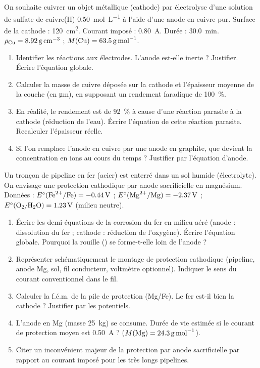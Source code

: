 \documentclass[11pt]{article}
\begin{document}
\begin{exercice}
On souhaite cuivrer un objet métallique (cathode) par électrolyse d'une solution de sulfate de cuivre(II)  \SI{0,50}{mol.L^{-1}} à l'aide d'une anode en cuivre pur. Surface de la cathode : \SI{120}{cm^2}. Courant imposé : \SI{0,80}{A}. Durée : \SI{30,0}{min}. $\rho_{\ce{Cu}} = \SI{8,92}{g.cm^{-3}}$ ; $M(\ce{Cu}) = \SI{63,5}{g.mol^{-1}}$.
\begin{enumerate}
    \item Identifier les réactions aux électrodes. L'anode est-elle inerte ? Justifier. Écrire l'équation globale.
    \item Calculer la masse de cuivre déposée sur la cathode et l'épaisseur moyenne de la couche (en \si{\micro\meter}), en supposant un rendement faradique de \SI{100}{\%}.
    \item En réalité, le rendement est de \SI{92}{\%} à cause d'une réaction parasite à la cathode (réduction de l'eau). Écrire l'équation de cette réaction parasite. Recalculer l'épaisseur réelle.
    \item Si l'on remplace l'anode en cuivre par une anode en graphite, que devient la concentration en ions  au cours du temps ? Justifier par l'équation d'anode.
\end{enumerate}
\end{exercice}

\begin{exercice}
Un tronçon de pipeline en fer (acier) est enterré dans un sol humide (électrolyte). On envisage une protection cathodique par anode sacrificielle en magnésium.
Données : $E^\circ(\ce{Fe^{2+}/Fe}) = \SI{-0,44}{V}$ ; $E^\circ(\ce{Mg^{2+}/Mg}) = \SI{-2,37}{V}$ ; $E^\circ(\ce{O2/H2O}) = \SI{+1,23}{V}$ (milieu neutre).
\begin{enumerate}
    \item Écrire les demi-équations de la corrosion du fer en milieu aéré (anode : dissolution du fer ; cathode : réduction de l'oxygène). Écrire l'équation globale. Pourquoi la rouille () se forme-t-elle loin de l'anode ?
    \item Représenter schématiquement le montage de protection cathodique (pipeline, anode Mg, sol, fil conducteur, voltmètre optionnel). Indiquer le sens du courant conventionnel dans le fil.
    \item Calculer la f.é.m. de la pile de protection (Mg/Fe). Le fer est-il bien la cathode ? Justifier par les potentiels.
    \item L'anode en Mg (masse \SI{25}{kg}) se consume. Durée de vie estimée si le courant de protection moyen est \SI{0,50}{A} ? ($M(\ce{Mg}) = \SI{24,3}{g.mol^{-1}}$).
    \item Citer un inconvénient majeur de la protection par anode sacrificielle par rapport au courant imposé pour les très longs pipelines.
\end{enumerate}
\end{exercice}
\end{document}
